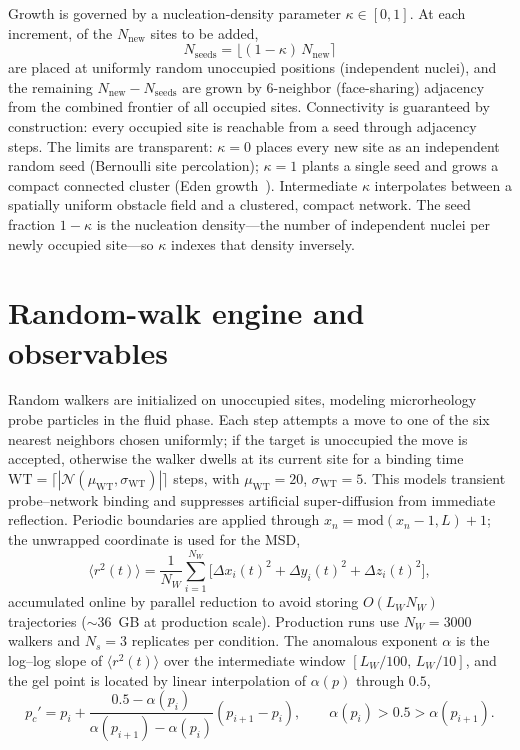 \documentclass[aps,prl,twocolumn,superscriptaddress,floatfix,nofootinbib,longbibliography]{revtex4-2}
\newcommand{\msd}{\langle r^2(t)\rangle}
\newcommand{\pcp}{p_c'}
\newcommand{\kap}{\kappa}
\begin{document}
Growth is governed by a nucleation-density parameter $\kap\in[0,1]$. At each increment, of the
$N_{\mathrm{new}}$ sites to be added,
\begin{equation}
  N_{\mathrm{seeds}}=\big\lfloor(1-\kap)\,N_{\mathrm{new}}\big\rceil
\end{equation}
are placed at uniformly random unoccupied positions (independent nuclei), and the remaining
$N_{\mathrm{new}}-N_{\mathrm{seeds}}$ are grown by 6-neighbor (face-sharing) adjacency from the
combined frontier of all occupied sites. Connectivity is guaranteed by construction: every
occupied site is reachable from a seed through adjacency steps. The limits are transparent:
$\kap=0$ places every new site as an independent random seed (Bernoulli site percolation);
$\kap=1$ plants a single seed and grows a compact connected cluster (Eden growth~\cite{Eden1961}).
Intermediate $\kap$ interpolates between a spatially uniform obstacle field and a clustered,
compact network. The seed fraction $1-\kap$ is the nucleation density---the number of
independent nuclei per newly occupied site---so $\kap$ indexes that density
inversely.

\section{Random-walk engine and observables}
Random walkers are initialized on unoccupied sites, modeling microrheology probe particles in
the fluid phase. Each step attempts a move to one of the six nearest neighbors chosen uniformly;
if the target is unoccupied the move is accepted, otherwise the walker dwells at its current site
for a binding time $\mathrm{WT}=\lceil|\mathcal{N}(\mu_{\mathrm{WT}},\sigma_{\mathrm{WT}})|\rceil$
steps, with $\mu_{\mathrm{WT}}=20$, $\sigma_{\mathrm{WT}}=5$. This models transient probe--network
binding and suppresses artificial super-diffusion from immediate reflection. Periodic boundaries
are applied through $x_n=\mathrm{mod}(x_n-1,L)+1$; the unwrapped coordinate is used for the MSD,
\begin{equation}
  \msd=\frac{1}{N_W}\sum_{i=1}^{N_W}\big[\Delta x_i(t)^2+\Delta y_i(t)^2+\Delta z_i(t)^2\big],
\end{equation}
accumulated online by parallel reduction to avoid storing $O(L_W N_W)$ trajectories
($\sim$36~GB at production scale). Production runs use $N_W=3000$ walkers and $N_s=3$ replicates
per condition. The anomalous exponent $\alpha$ is the log--log slope of $\msd$ over the
intermediate window $[L_W/100,\,L_W/10]$, and the gel point is located by linear interpolation of
$\alpha(p)$ through $0.5$,
\begin{equation}
  \pcp=p_i+\frac{0.5-\alpha(p_i)}{\alpha(p_{i+1})-\alpha(p_i)}(p_{i+1}-p_i),
  \qquad \alpha(p_i)>0.5>\alpha(p_{i+1}).
\end{equation}
\end{document}
